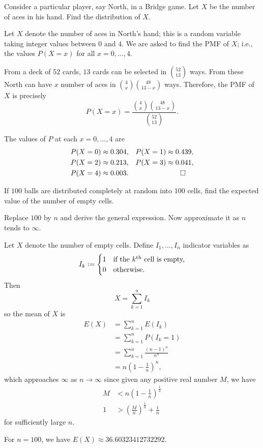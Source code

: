 \begin{problem}[Handout 1, \# 16]
  Consider a particular player, say North, in a Bridge game. Let \(X\) be
  the number of aces in his hand. Find the distribution of \(X\).
\end{problem}
\begin{solution*}
  Let \(X\) denote the number of aces in North's hand; this is a random
  variable taking integer values between \(0\) and \(4\). We are asked to
  find the PMF of \(X\); i.e., the values \(P(X=x)\) for all
  \(x=0,\dotsc,4\).

  From a deck of \(52\) cards, \(13\) cards can be selected in
  \(\binom{52}{13}\) ways. From these North can have \(x\) number of aces
  in \(\binom{4}{x}\binom{48}{13-x}\) ways. Therefore, the PMF of \(X\) is
  precisely
  \[
    P(X=x)=\frac{\binom{4}{x}\binom{48}{13-x}}{\binom{52}{13}}.
  \]

  The values of \(P\) at each \(x=0,\dotsc,4\) are
  \begin{align*}
    P(X=0)&\approx 0.304,
    &P(X=1)&\approx 0.439,\\
    P(X=2)&\approx 0.213,
    &P(X=3)&\approx 0.041,\\
    P(X=4)&\approx 0.003.&&\qedhere
  \end{align*}
\end{solution*}

\begin{problem}[Handout 1, \# 20]
  If \(100\) balls are distributed completely at random into \(100\) cells,
  find the expected value of the number of empty cells.

  \noindent Replace \(100\) by \(n\) and derive the general expression. Now
  approximate it as \(n\) tends to \(\infty\).
\end{problem}
\begin{solution*}
  Let \(X\) denote the number of empty cells. Define \(I_1,\dotsc,I_n\)
  indicator variables as
  \[
    I_k\defeq
    \begin{cases}
      1&\text{if the \(k\)\textsup{th} cell is empty,}\\
      0&\text{otherwise.}
    \end{cases}
  \]
  Then
  \[
    X=\sum_{k=1}^n I_k
  \]
  so the mean of \(X\) is
  \begin{align*}
    E(X)
    &=\sum_{k=1}^n E(I_k)\\
    &=\sum_{k=1}^n P(I_k=1)\\
    &=\sum_{k=1}^n\frac{(n-1)^n}{n^n}\\
    &=n\left(1-\frac{1}{n}\right)^n,
  \end{align*}
  which approaches \(\infty\) as \(n\to\infty\) since given any positive
  real number \(M\), we have
  \begin{align*}
    M&<n\left(1-\frac{1}{n}\right)^{\frac{1}{n}}\\
    1&>\left(\frac{M}{n}\right)^{\frac{1}{n}}+\frac{1}{n}
  \end{align*}
  for sufficiently large \(n\).

  For \(n=100\), we have \(E(X)\approx\num{36.60323412732292}\).
\end{solution*}

